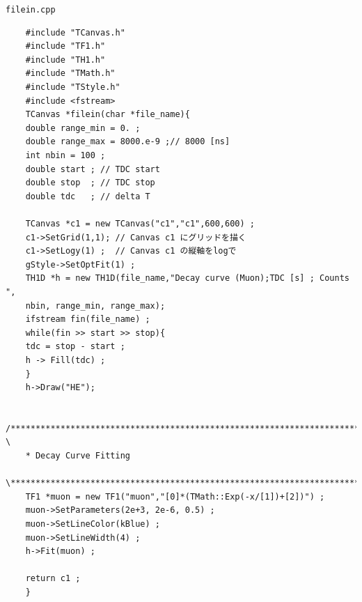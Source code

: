 \documentclass{jarticle}
\begin{document}
 \begin{itembox}{\texttt{filein.cpp}}
\begin{verbatim}
	#include "TCanvas.h"
	#include "TF1.h"
	#include "TH1.h"
	#include "TMath.h"
	#include "TStyle.h"
	#include <fstream>
	TCanvas *filein(char *file_name){
	double range_min = 0. ;
	double range_max = 8000.e-9 ;// 8000 [ns]
	int nbin = 100 ;  
	double start ; // TDC start
	double stop  ; // TDC stop
	double tdc   ; // delta T

	TCanvas *c1 = new TCanvas("c1","c1",600,600) ;
	c1->SetGrid(1,1); // Canvas c1 にグリッドを描く
	c1->SetLogy(1) ;  // Canvas c1 の縦軸をlogで
	gStyle->SetOptFit(1) ;
	TH1D *h = new TH1D(file_name,"Decay curve (Muon);TDC [s] ; Counts ",
	nbin, range_min, range_max);
	ifstream fin(file_name) ;
	while(fin >> start >> stop){
	tdc = stop - start ;
	h -> Fill(tdc) ;
	}
	h->Draw("HE");

	/******************************************************************************** \
	* Decay Curve Fitting
	\********************************************************************************/
	TF1 *muon = new TF1("muon","[0]*(TMath::Exp(-x/[1])+[2])") ;
	muon->SetParameters(2e+3, 2e-6, 0.5) ;
	muon->SetLineColor(kBlue) ;
	muon->SetLineWidth(4) ;
	h->Fit(muon) ;

	return c1 ;
	}
\end{verbatim}
 \end{itembox}



 \clearpage
\end{document}
